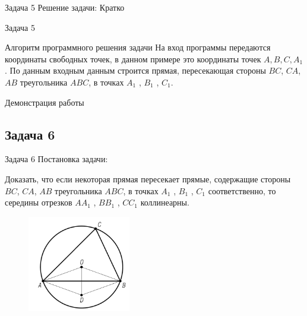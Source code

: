 \documentclass{beamer}
\begin{document}
\begin{frame}
   \begin{block}{Задача 5}
      Решение задачи:
      Кратко
   \end{block}
\end{frame}

\begin{frame}
   \begin{block}{Задача 5}
      \begin{block}{Алгоритм программного решения задачи}
         На вход программы передаются координаты свободных точек, в данном примере это координаты точек \(A,B,C,A_1\). По данным входным данным строится прямая, пересекающая стороны \(BC\), \(CA\), \(AB\) треугольника \(ABC\), в точках \(A_1\) , \(B_1\) , \(C_1\).
      \end{block}
   \end{block}
\end{frame}

\begin{frame}
   Демонстрация работы
\end{frame}

\begin{frame}
   \subsection{Задача 6}
   \begin{block}{Задача 6}
      Постановка задачи:

      Доказать, что если некоторая прямая пересекает прямые, содержащие стороны \(BC\), \(CA\), \(AB\) треугольника \(ABC\), в точках \(A_1\) , \(B_1\) , \(C_1\) соответственно, то середины отрезков \(AA_1\) , \(BB_1\) , \(CC_1\) коллинеарны.

      \begin{figure}[h]
         \centering
         \includegraphics[width=0.4\textwidth]{images/task1.png}
         \label{task6}
      \end{figure}
   \end{block}
\end{frame}
\end{document}
